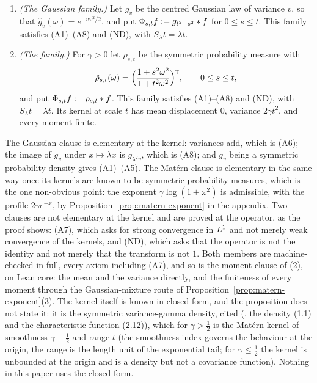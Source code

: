 \begin{proposition}\label{prop:two-members}
\begin{enumerate}
\item \emph{(The Gaussian family.)} Let $g_v$ be the centred Gaussian law of variance $v$, so
that $\hat g_v(\omega) = e^{-v\omega^2/2}$, and put $\Phi_{s,t}f := g_{t^2-s^2} * f$ for
$0 \le s \le t$. This family satisfies (A1)--(A8) and (ND), with $S_\lambda t = \lambda t$.
\item \emph{(The \Matern{} family.)} For $\gamma > 0$ let $\rho_{s,t}$ be the symmetric
probability measure with
\[
  \hat\rho_{s,t}(\omega) = \Bigl(\frac{1 + s^2\omega^2}{1 + t^2\omega^2}\Bigr)^{\gamma},
  \qquad 0 \le s \le t,
\]
and put $\Phi_{s,t}f := \rho_{s,t} * f$. This family satisfies (A1)--(A8) and (ND), with
$S_\lambda t = \lambda t$. Its kernel at scale $t$ has mean displacement $0$, variance
$2\gamma t^2$, and every moment finite.
\end{enumerate}
\end{proposition}

The Gaussian clause is elementary at the kernel: variances add, which is (A6); the image of
$g_v$ under $x \mapsto \lambda x$ is $g_{\lambda^2v}$, which is (A8); and $g_v$ being a
symmetric probability density gives (A1)--(A5). The Mat\'ern clause is elementary in the
same way once its kernels are known to be symmetric probability measures, which is the one
non-obvious point: the exponent $\gamma\log(1 + \omega^2)$ is admissible, with the profile
$2\gamma e^{-x}$, by Proposition~\ref{prop:matern-exponent} in the appendix. Two clauses are
not elementary at the kernel and are proved at the operator, as the proof shows: (A7), which
asks for strong convergence in $L^1$ and not merely weak convergence of the kernels, and
(ND), which asks that the operator is not the identity and not merely that the transform is
not $1$. Both members are machine-checked in full, every axiom including (A7), and so is
the moment clause of (2), on Lean core: the mean and the variance directly, and the
finiteness of every moment through the Gaussian-mixture route of
Proposition~\ref{prop:matern-exponent}(3). The kernel itself is known in closed form, and
the proposition does not state it: it is the symmetric variance-gamma density, cited
(, the density (1.1) and the characteristic function (2.12)),
which for $\gamma > \tfrac12$ is the Mat\'ern kernel of smoothness $\gamma - \tfrac12$ and
range $t$ (the smoothness index governs the behaviour at the origin, the range is the
length unit of the exponential tail; for $\gamma \le \tfrac12$ the kernel is unbounded at
the origin and is a density but not a covariance function). Nothing in this paper uses the
closed form.

